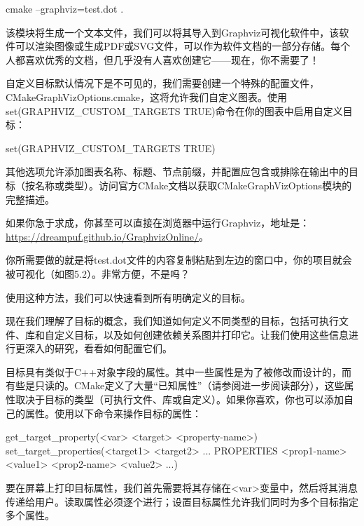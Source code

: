 \begin{shell}
cmake --graphviz=test.dot .
\end{shell}

该模块将生成一个文本文件，我们可以将其导入到Graphviz可视化软件中，该软件可以渲染图像或生成PDF或SVG文件，可以作为软件文档的一部分存储。每个人都喜欢优秀的文档，但几乎没有人喜欢创建它——现在，你不需要了！

自定义目标默认情况下是不可见的，我们需要创建一个特殊的配置文件，CMakeGraphVizOptions.cmake，这将允许我们自定义图表。使用set(GRAPHVIZ\_CUSTOM\_TARGETS TRUE)命令在你的图表中启用自定义目标：


\begin{cmake}
set(GRAPHVIZ_CUSTOM_TARGETS TRUE)
\end{cmake}

其他选项允许添加图表名称、标题、节点前缀，并配置应包含或排除在输出中的目标（按名称或类型）。访问官方CMake文档以获取CMakeGraphVizOptions模块的完整描述。

如果你急于求成，你甚至可以直接在浏览器中运行Graphviz，地址是：\url{https://dreampuf.github.io/GraphvizOnline/}。

你所需要做的就是将test.dot文件的内容复制粘贴到左边的窗口中，你的项目就会被可视化（如图5.2）。非常方便，不是吗？


使用这种方法，我们可以快速看到所有明确定义的目标。

现在我们理解了目标的概念，我们知道如何定义不同类型的目标，包括可执行文件、库和自定义目标，以及如何创建依赖关系图并打印它。让我们使用这些信息进行更深入的研究，看看如何配置它们。


目标具有类似于C++对象字段的属性。其中一些属性是为了被修改而设计的，而有些是只读的。CMake定义了大量“已知属性”（请参阅进一步阅读部分），这些属性取决于目标的类型（可执行文件、库或自定义）。如果你喜欢，你也可以添加自己的属性。使用以下命令来操作目标的属性：

\begin{shell}
get_target_property(<var> <target> <property-name>)
set_target_properties(<target1> <target2> ...
                      PROPERTIES <prop1-name> <value1>
                      <prop2-name> <value2> ...)
\end{shell}

要在屏幕上打印目标属性，我们首先需要将其存储在<var>变量中，然后将其消息传递给用户。读取属性必须逐个进行；设置目标属性允许我们同时为多个目标指定多个属性。

